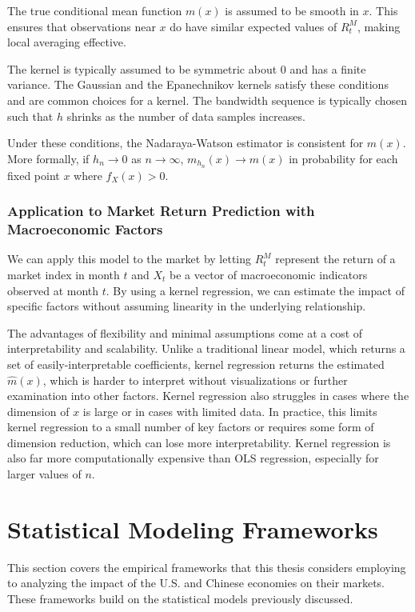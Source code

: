 The true conditional mean function $m(x)$ is assumed to be smooth in $x$. This ensures that observations near $x$ do have similar expected values of $R^M_t$, making local averaging effective. 

The kernel is typically assumed to be symmetric about 0 and has a finite variance. The Gaussian and the Epanechnikov kernels satisfy these conditions and are common choices for a kernel. The bandwidth sequence is typically chosen such that $h$ shrinks as the number of data samples increases. 

Under these conditions, the Nadaraya-Watson estimator is consistent for $m(x)$.\cite{nadaraya, watson} More formally, if $h_n\to 0$ as $n\to \infty$, $m_{h_n}(x)\to m(x)$ in probability for each fixed point $x$ where $f_X(x)>0$. 

\subsubsection{Application to Market Return Prediction with Macroeconomic Factors}

We can apply this model to the market by letting $R^M_t$ represent the return of a market index in month $t$ and $X_t$ be a vector of macroeconomic indicators observed at month $t$. By using a kernel regression, we can estimate the impact of specific factors without assuming linearity in the underlying relationship. 

The advantages of flexibility and minimal assumptions come at a cost of interpretability and scalability. Unlike a traditional linear model, which returns a set of easily-interpretable coefficients, kernel regression returns the estimated $\hat{m}(x)$, which is harder to interpret without visualizations or further examination into other factors. Kernel regression also struggles in cases where the dimension of $x$ is large or in cases with limited data. In practice, this limits kernel regression to a small number of key factors or requires some form of dimension reduction, which can lose more interpretability. Kernel regression is also far more computationally expensive than OLS regression, especially for larger values of $n$.

\section{Statistical Modeling Frameworks}

This section covers the empirical frameworks that this thesis considers employing to analyzing the impact of the U.S. and Chinese economies on their markets. These frameworks build on the statistical models previously discussed.

